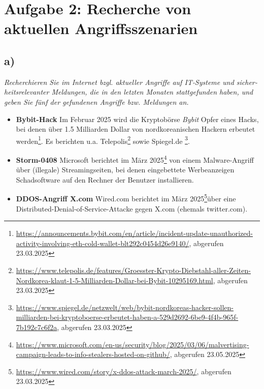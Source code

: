 \chapter{Aufgabe 2:  Recherche von aktuellen Angriffsszenarien}

\section{a)}

\textit{Recherchieren Sie im Internet bzgl. aktueller Angriffe auf IT‐Systeme und sicher‐
heitsrelevanter Meldungen, die in den letzten Monaten stattgefunden haben, und geben Sie fünf der gefundenen Angriffe bzw. Meldungen an. }

\vspace{5mm}

\begin{itemize}
    \itemsep0.5em
    \item \textbf{Bybit-Hack} Im Februar 2025 wird die Kryptobörse \textit{Bybit} Opfer eines Hacks, bei denen über 1.5 Milliarden Dollar von nordkoreanischen Hackern erbeutet werden\footnote{
    \url{https://announcements.bybit.com/en/article/incident-update-unauthorized-activity-involving-eth-cold-wallet-blt292c0454d26e9140/}, abgerufen 23.03.2025
    }. Es berichten u.a. Telepolis\footnote{
        \url{https://www.telepolis.de/features/Groesster-Krypto-Diebstahl-aller-Zeiten-Nordkorea-klaut-1-5-Milliarden-Dollar-bei-Bybit-10295169.html}, abgerufen 23.03.2025
    } sowie Spiegel.de \footnote{
        \url{https://www.spiegel.de/netzwelt/web/bybit-nordkoreas-hacker-sollen-milliarden-bei-kryptoboerse-erbeutet-haben-a-529d2692-6be9-4f4b-965f-7b192c7c6f2a}, abgerufen 23.03.2025
    }.
    \item \textbf{Storm-0408} Microsoft berichtet im März 2025\footnote{
    \url{https://www.microsoft.com/en-us/security/blog/2025/03/06/malvertising-campaign-leads-to-info-stealers-hosted-on-github/}, abgerufen 23.05.2025
    } von einem Malware-Angriff über (illegale) Streamingseiten, bei denen eingebettete Werbeanzeigen Schadsoftware auf den Rechner der Benutzer installieren.
    \item \textbf{DDOS-Angriff X.com} Wired.com berichtet im März 2025\footnote{
    \url{https://www.wired.com/story/x-ddos-attack-march-2025/}, abgerufen 23.03.2025
    }über eine Distributed-Denial-of-Service-Attacke gegen X.com (ehemals twitter.com).


\end{itemize}

